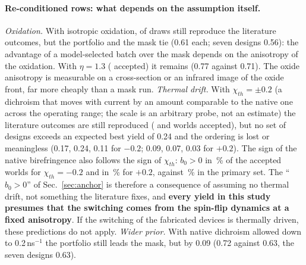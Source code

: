 \paragraph{Re-conditioned rows: what depends on the assumption itself.}
\emph{Oxidation.} With isotropic oxidation, \nAccOxTen{} of \nDrawsOxTen{} draws still reproduce the literature outcomes, but the portfolio and the mask tie (0.61 each; seven designs 0.56): the advantage of a model-selected batch over the mask depends on the anisotropy of the oxidation. With $\eta=1.3$ (\nAccOxThirteen{} accepted) it remains (0.77 against 0.71). The oxide anisotropy is measurable on a cross-section or an infrared image of the oxide front, far more cheaply than a mask run.
\emph{Thermal drift.} With $\chi_{th}=\pm0.2$ (a dichroism that moves with current by an amount comparable to the native one across the operating range; the scale is an arbitrary probe, not an estimate) the literature outcomes are still reproduced (\nAccChiMinus{} and \nAccChiPlus{} worlds accepted), but no set of designs exceeds an expected best yield of 0.24 and the ordering is lost or meaningless (0.17, 0.24, 0.11 for $-0.2$; 0.09, 0.07, 0.03 for $+0.2$).
The sign of the native birefringence also follows the sign of $\chi_{th}$: $b_0>0$ in \fracBzeroPosChiMinus{}\,\% of the accepted worlds for $\chi_{th}=-0.2$ and in \fracBzeroPosChiPlus{}\,\% for $+0.2$, against \fracBzeroPos{}\,\% in the primary set.
The ``$b_0>0$'' of Sec.~\ref{sec:anchor} is therefore a consequence of assuming no thermal drift, not something the literature fixes, and \textbf{every yield in this study presumes that the switching comes from the spin-flip dynamics at a fixed anisotropy}. If the switching of the fabricated devices is thermally driven, these predictions do not apply.
\emph{Wider prior.} With native dichroism allowed down to 0.2\,ns$^{-1}$ the portfolio still leads the mask, but by 0.09 (0.72 against 0.63, the seven designs 0.63).
